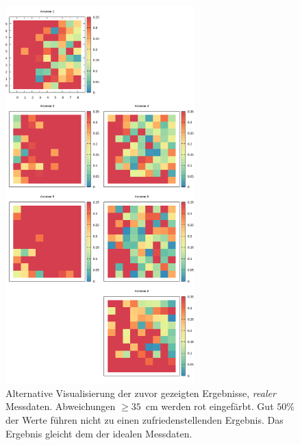 %
\begin{figure}[!ht]
	\centering
	\caption[Limitierte Ergebnisse - Reale Messwerte]{Alternative Visualisierung der zuvor gezeigten Ergebnisse, \textit{realer} Messdaten.  Abweichungen $\ge35$~cm werden rot eingefärbt. Gut $50\%$ der Werte führen nicht zu einen zufriedenstellenden Ergebnis. Das Ergebnis gleicht dem der idealen Messdaten. }
	\label{fig:results5}
	\vspace{3mm}
	\includegraphics[width=0.65\textwidth]{img/limitedReal.png}
\end{figure}
%
